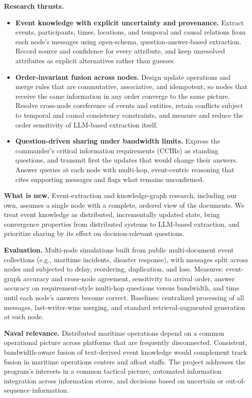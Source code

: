 \documentclass[11pt]{article}
\newcommand{\head}[1]{{\color{navy}\textbf{#1}}\enspace}
\begin{document}
\head{Research thrusts.}
\begin{itemize}
\item \textbf{Event knowledge with explicit uncertainty and provenance.} Extract events, participants, times, locations, and temporal and causal relations from each node's messages using open-schema, question-answer-based extraction. Record source and confidence for every attribute, and keep unresolved attributes as explicit alternatives rather than guesses.
\item \textbf{Order-invariant fusion across nodes.} Design update operations and merge rules that are commutative, associative, and idempotent, so nodes that receive the same information in any order converge to the same picture. Resolve cross-node coreference of events and entities, retain conflicts subject to temporal and causal consistency constraints, and measure and reduce the order sensitivity of LLM-based extraction itself.
\item \textbf{Question-driven sharing under bandwidth limits.} Express the commander's critical information requirements (CCIRs) as standing questions, and transmit first the updates that would change their answers. Answer queries at each node with multi-hop, event-centric reasoning that cites supporting messages and flags what remains unconfirmed.
\end{itemize}

\head{What is new.} Event-extraction and knowledge-graph research, including our own, assumes a single node with a complete, ordered view of the documents. We treat event knowledge as distributed, incrementally updated state, bring convergence properties from distributed systems to LLM-based extraction, and prioritize sharing by its effect on decision-relevant questions.

\head{Evaluation.} Multi-node simulations built from public multi-document event collections (e.g., maritime incidents, disaster response), with messages split across nodes and subjected to delay, reordering, duplication, and loss. Measures: event-graph accuracy and cross-node agreement, sensitivity to arrival order, answer accuracy on requirement-style multi-hop questions versus bandwidth, and time until each node's answers become correct. Baselines: centralized processing of all messages, last-writer-wins merging, and standard retrieval-augmented generation at each node.

\head{Naval relevance.} Distributed maritime operations depend on a common operational picture across platforms that are frequently disconnected. Consistent, bandwidth-aware fusion of text-derived event knowledge would complement track fusion in maritime operations centers and afloat staffs. The project addresses the program's interests in a common tactical picture, automated information integration across information stores, and decisions based on uncertain or out-of-sequence information.
\end{document}
